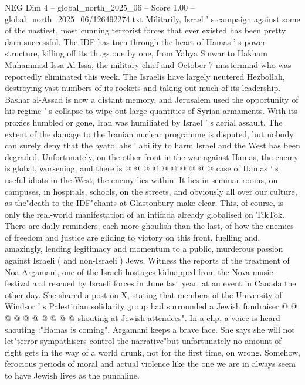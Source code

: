 \begin{textsample}{NEG Dim 4 – global\_north\_2025\_06 – Score 1.00 – global\_north\_2025\_06/126492274.txt}  \label{ex:f4_neg_078}
Militarily, Israel ' s campaign against some of the nastiest, most cunning terrorist forces that ever existed has been pretty darn successful.
The IDF has torn through the heart of Hamas ' s power structure, killing off its thugs one by one, from Yahya Sinwar to Hakham Muhammad Issa Al-Issa, the military chief and October 7 mastermind who was reportedly eliminated this week.
The Israelis have largely neutered Hezbollah, destroying vast numbers of its rockets and taking out much of its leadership.
Bashar al-Assad is now a distant memory, and Jerusalem used the opportunity of his regime ' s collapse to wipe out large quantities of Syrian armaments.
With its proxies humbled or gone, Iran was humiliated by Israel ' s aerial assault.
The extent of the damage to the Iranian nuclear programme is disputed, but nobody can surely deny that the ayatollahs ' ability to harm Israel and the West has been degraded.
Unfortunately, on the other front in the war against Hamas, the enemy is global, worsening, and there is @ @ @ @ @ @ @ @ @ @ case of Hamas ' s useful idiots in the West, the enemy lies within.
It lies in seminar rooms, on campuses, in hospitals, schools, on the streets, and obviously all over our culture, as the"death to the IDF"chants at Glastonbury make clear.
This, of course, is only the real-world manifestation of an intifada already globalised on TikTok.
There are daily reminders, each more ghoulish than the last, of how the enemies of freedom and justice are gliding to victory on this front, fuelling and, amazingly, lending legitimacy and momentum to a public, murderous passion against Israeli ( and non-Israeli ) Jews.
Witness the reports of the treatment of Noa Argamani, one of the Israeli hostages kidnapped from the Nova music festival and rescued by Israeli forces in June last year, at an event in Canada the other day.
She shared a post on X, stating that members of the University of Windsor ' s Palestinian solidarity group had surrounded a Jewish fundraiser @ @ @ @ @ @ @ @ @ @ shouting at Jewish attendees".
In a clip, a voice is heard shouting :"Hamas is coming".
Argamani keeps a brave face.
She says she will not let"terror sympathisers control the narrative"but unfortunately no amount of right gets in the way of a world drunk, not for the first time, on wrong.
Somehow, ferocious periods of moral and actual violence like the one we are in always seem to have Jewish lives as the punchline.

\end{textsample}
